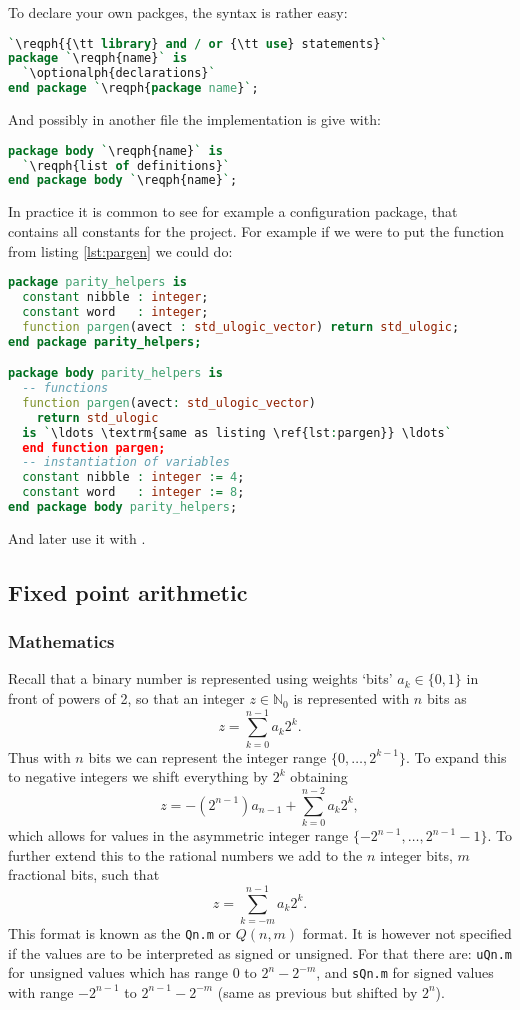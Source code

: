 \documentclass[margin=small]{tex/hsrzf}
\begin{document}
To declare your own packges, the syntax is rather easy:
\begin{lstlisting}[language = vhdl]
`\reqph{{\tt library} and / or {\tt use} statements}`
package `\reqph{name}` is
  `\optionalph{declarations}`
end package `\reqph{package name}`;
\end{lstlisting}
And possibly in another file the implementation is give with:
\begin{lstlisting}[language = vhdl]
package body `\reqph{name}` is
  `\reqph{list of definitions}`
end package body `\reqph{name}`;
\end{lstlisting}

In practice it is common to see for example a configuration package, that contains all constants for the project. For example if we were to put the function  from listing \ref{lst:pargen} we could do:
\begin{lstlisting}[language = vhdl]
package parity_helpers is
  constant nibble : integer;
  constant word   : integer;
  function pargen(avect : std_ulogic_vector) return std_ulogic;
end package parity_helpers;

package body parity_helpers is
  -- functions
  function pargen(avect: std_ulogic_vector)
    return std_ulogic
  is `\ldots \textrm{same as listing \ref{lst:pargen}} \ldots`
  end function pargen;
  -- instantiation of variables
  constant nibble : integer := 4;
  constant word   : integer := 8;
end package body parity_helpers;
\end{lstlisting}
And later use it with .

\subsection{Fixed point arithmetic}

\subsubsection{Mathematics}

Recall that a binary number is represented using weights `bits' \(a_k \in \{ 0, 1 \}\) in front of powers of 2, so that an integer \(z \in \mathbb{N}_0\) is represented with \(n\) bits as
\[
  z = \sum_{k=0}^{n-1} a_k 2^k .
\]
Thus with \(n\) bits we can represent the integer range \(\{0,\ldots, 2^{k-1}\}\).
To expand this to negative integers we shift everything by \(2^k\) obtaining
\[
  z = -(2^{n-1}) a_{n-1} + \sum_{k=0}^{n-2} a_k 2^k,
\]
which allows for values in the asymmetric integer range \(\{-2^{n-1},\ldots, 2^{n-1} -1\}\). To further extend this to the rational numbers we add to the \(n\) integer bits, \(m\) fractional bits, such that
\[
  z = \sum_{k = -m}^{n - 1} a_k 2^k .
\]
This format is known as the \texttt{Qn.m} or \(Q(n,m)\) format. It is however not specified if the values are to be interpreted as signed or unsigned. For that there are: \texttt{uQn.m} for unsigned values which has range 0 to \(2^n - 2^{-m}\), and \texttt{sQn.m} for signed values with range \(-2^{n-1}\) to \(2^{n-1} - 2^{-m}\) (same as previous but shifted by \(2^n\)).
\end{document}
